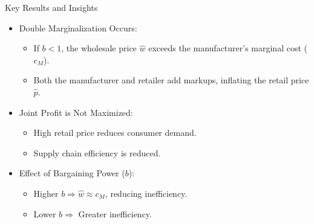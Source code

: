 \documentclass[aspectratio=169]{beamer}  %
\begin{document}
\begin{frame}{Key Results and Insights}
    \begin{itemize}
        \item Double Marginalization Occurs:
        \begin{itemize}
            \item If \(b < 1\), the wholesale price \(\hat{w}\) exceeds the manufacturer's marginal cost (\(c_M\)).
            \item Both the manufacturer and retailer add markups, inflating the retail price \(\hat{p}\).
        \end{itemize}
        \item Joint Profit is Not Maximized:
        \begin{itemize}
            \item High retail price reduces consumer demand.
            \item Supply chain efficiency is reduced.
        \end{itemize}
        \item Effect of Bargaining Power (\(b\)):
        \begin{itemize}
            \item Higher \(b \Rightarrow \hat{w} \approx c_M\), reducing inefficiency.
            \item Lower $b \Rightarrow$ Greater inefficiency.
        \end{itemize}
    \end{itemize}
\end{frame}
\end{document}
